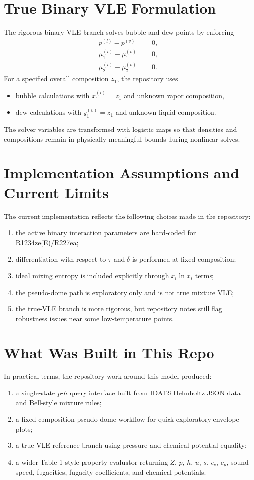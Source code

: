 \documentclass[11pt]{article}
\begin{document}
\section{True Binary VLE Formulation}
The rigorous binary VLE branch solves bubble and dew points by enforcing
\begin{align}
p^{(l)} - p^{(v)} &= 0, \\
\mu_1^{(l)} - \mu_1^{(v)} &= 0, \\
\mu_2^{(l)} - \mu_2^{(v)} &= 0.
\end{align}
For a specified overall composition $z_1$, the repository uses
\begin{itemize}
\item bubble calculations with $x_1^{(l)} = z_1$ and unknown vapor composition,
\item dew calculations with $y_1^{(v)} = z_1$ and unknown liquid composition.
\end{itemize}
The solver variables are transformed with logistic maps so that densities and compositions remain in physically meaningful bounds during nonlinear solves.

\section{Implementation Assumptions and Current Limits}
The current implementation reflects the following choices made in the repository:
\begin{enumerate}
\item the active binary interaction parameters are hard-coded for R1234ze(E)/R227ea;
\item differentiation with respect to $\tau$ and $\delta$ is performed at fixed composition;
\item ideal mixing entropy is included explicitly through $x_i \ln x_i$ terms;
\item the pseudo-dome path is exploratory only and is not true mixture VLE;
\item the true-VLE branch is more rigorous, but repository notes still flag robustness issues near some low-temperature points.
\end{enumerate}

\section{What Was Built in This Repo}
In practical terms, the repository work around this model produced:
\begin{enumerate}
\item a single-state $p$-$h$ query interface built from IDAES Helmholtz JSON data and Bell-style mixture rules;
\item a fixed-composition pseudo-dome workflow for quick exploratory envelope plots;
\item a true-VLE reference branch using pressure and chemical-potential equality;
\item a wider Table-1-style property evaluator returning $Z$, $p$, $h$, $u$, $s$, $c_v$, $c_p$, sound speed, fugacities, fugacity coefficients, and chemical potentials.
\end{enumerate}
\end{document}
